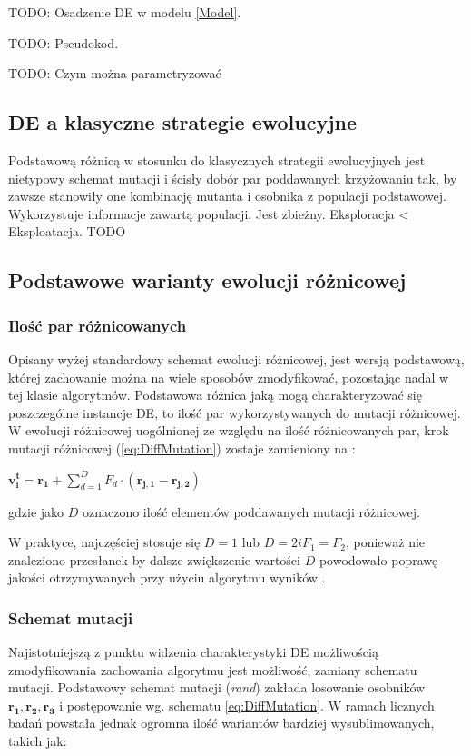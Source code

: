 \documentclass[12pt,a4paper]{report}
\begin{document}
{{\par{TODO: Osadzenie DE w modelu \ref{Model}.}
\par{TODO: Pseudokod.}
\par{TODO: Czym można parametryzować}

\subsection{DE a klasyczne strategie ewolucyjne}
\par{
Podstawową różnicą w stosunku do klasycznych strategii ewolucyjnych jest nietypowy schemat mutacji i ścisły dobór par poddawanych krzyżowaniu tak, by zawsze stanowiły one kombinację mutanta i osobnika z populacji  podstawowej.
Wykorzystuje informacje zawartą populacji.
Jest zbieżny.
Eksploracja < Eksploatacja.
TODO
}


\subsection{Podstawowe warianty ewolucji różnicowej}
\subsubsection{Ilość par różnicowanych}
\par{
Opisany wyżej standardowy schemat ewolucji różnicowej, jest wersją podstawową, której zachowanie można na wiele sposobów zmodyfikować, pozostając nadal w tej klasie algorytmów. Podstawowa różnica jaką mogą charakteryzować się poszczególne instancje DE, to ilość par wykorzystywanych do mutacji różnicowej. W ewolucji różnicowej uogólnionej ze względu na ilość różnicowanych par, krok mutacji różnicowej (\ref{eq:DiffMutation}) zostaje zamieniony na \cite{PracticalInsights}:
\begin{center}
 $\mathbf{v_i^{t}} = \mathbf{r_1} + \sum_{d = 1}^D F_d \cdot (\mathbf{r_{j,1}} - \mathbf{r_{j,2}})$
\end{center}
gdzie jako $D$ oznaczono ilość elementów poddawanych mutacji różnicowej.
}
\par{
W praktyce, najczęściej stosuje się $D = 1$ lub $D = 2 i F_1 = F_2$, ponieważ nie znaleziono przesłanek by dalsze zwiększenie wartości $D$ powodowało poprawę jakości otrzymywanych przy użyciu algorytmu wyników \cite{PracticalInsights}.
\subsubsection{Schemat mutacji}
\par{
Najistotniejszą z punktu widzenia charakterystyki DE możliwością zmodyfikowania zachowania algorytmu jest możliwość, zamiany schematu mutacji. Podstawowy schemat mutacji (\emph{rand}) zakłada losowanie osobników $\mathbf{r_1}, \mathbf{r_2}, \mathbf{r_3}$ i postępowanie wg. schematu \ref{eq:DiffMutation}. W ramach licznych badań powstała jednak ogromna ilość wariantów bardziej wysublimowanych, takich jak:
\begin{description}


\end{description}}}}}
\end{document}
